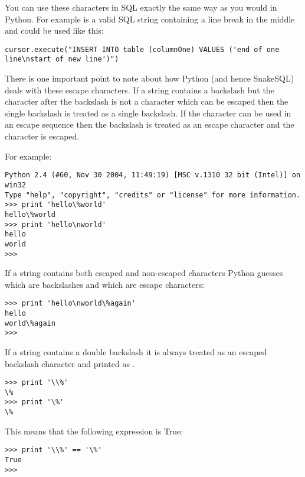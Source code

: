 \documentclass{howto}
\begin{document}
You can use these characters in SQL exactly the same way as you would in Python. For example  is a valid SQL string containing a line break in the middle and could be used like this:

\begin{verbatim}
cursor.execute("INSERT INTO table (columnOne) VALUES ('end of one line\nstart of new line')")
\end{verbatim}

There is one important point to note about how Python (and hence SnakeSQL) deals with these escape characters. If a string contains a backslash \code{\e} but the character after the backslash is not a character which can be escaped then the single backslash is treated as a single backslash. If the character can be used in an escape sequence then the backslash is treated as an escape character and the character is escaped.


For example:

\begin{verbatim}
Python 2.4 (#60, Nov 30 2004, 11:49:19) [MSC v.1310 32 bit (Intel)] on win32
Type "help", "copyright", "credits" or "license" for more information.
>>> print 'hello\%world'
hello\%world
>>> print 'hello\nworld'
hello
world
>>> 
\end{verbatim}

If a string contains both escaped and non-escaped characters Python guesses which are backslashes and which are escape characters:

\begin{verbatim}
>>> print 'hello\nworld\%again'
hello
world\%again
>>>
\end{verbatim}

If a string contains a double backslash \code{\e \e} it is always treated as an escaped backslash character and printed as \code{\e}. 

\begin{verbatim}
>>> print '\\%'
\%
>>> print '\%'
\%
\end{verbatim}

This means that the following expression is True:

\begin{verbatim}
>>> print '\\%' == '\%'
True
>>>
\end{verbatim}
\end{document}
